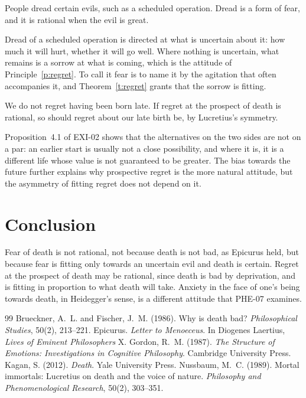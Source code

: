 \documentclass{situationist-preprint}
\begin{document}
\begin{objection}[Dread]\label{o:dread}
People dread certain evils, such as a scheduled operation. Dread is a form of fear, and it is rational when the evil is great.
\end{objection}

\begin{reply}
Dread of a scheduled operation is directed at what is uncertain about it: how much it will hurt, whether it will go well. Where nothing is uncertain, what remains is a sorrow at what is coming, which is the attitude of Principle~\ref{p:regret}. To call it fear is to name it by the agitation that often accompanies it, and Theorem~\ref{t:regret} grants that the sorrow is fitting.
\end{reply}

\begin{objection}[Asymmetry]\label{o:asym}
We do not regret having been born late. If regret at the prospect of death is rational, so should regret about our late birth be, by Lucretius's symmetry.
\end{objection}

\begin{reply}
Proposition~4.1 of EXI-02 shows that the alternatives on the two sides are not on a par: an earlier start is usually not a close possibility, and where it is, it is a different life whose value is not guaranteed to be greater. The bias towards the future \citep{BruecknerFischer1986} further explains why prospective regret is the more natural attitude, but the asymmetry of fitting regret does not depend on it.
\end{reply}

\section{Conclusion}

Fear of death is not rational, not because death is not bad, as Epicurus held, but because fear is fitting only towards an uncertain evil and death is certain. Regret at the prospect of death may be rational, since death is bad by deprivation, and is fitting in proportion to what death will take. Anxiety in the face of one's being towards death, in Heidegger's sense, is a different attitude that PHE-07 examines.

\begin{thebibliography}{99}\small
{} Brueckner, A.~L. and Fischer, J.~M. (1986). Why is death bad? \emph{Philosophical Studies}, 50(2), 213--221.
 Epicurus. \emph{Letter to Menoeceus}. In Diogenes Laertius, \emph{Lives of Eminent Philosophers} X.
 Gordon, R.~M. (1987). \emph{The Structure of Emotions: Investigations in Cognitive Philosophy}. Cambridge University Press.
 Kagan, S. (2012). \emph{Death}. Yale University Press.
 Nussbaum, M.~C. (1989). Mortal immortals: Lucretius on death and the voice of nature. \emph{Philosophy and Phenomenological Research}, 50(2), 303--351.
\end{thebibliography}
\end{document}
